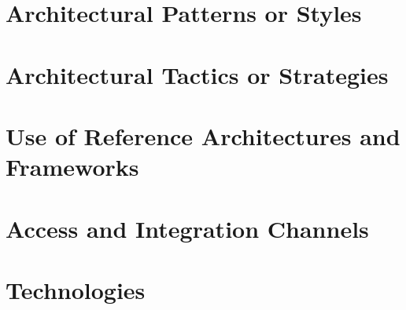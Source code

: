\documentclass[11pt,a4paper,titlepage]{article}
\begin{document}
\section{Architectural Patterns or Styles}
	

\section{Architectural Tactics or Strategies}

\section{Use of Reference Architectures and Frameworks}

\section{Access and Integration Channels}

\section{Technologies}
	
\end{document}
